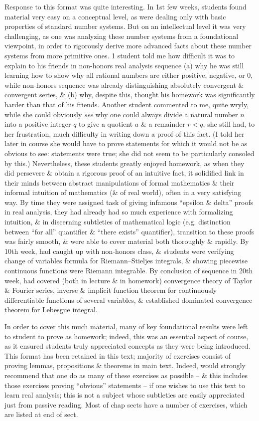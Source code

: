 \documentclass{article}
\begin{document}
\begin{itemize}
	Response to this format was quite interesting. In 1st few weeks, students found material very easy on a conceptual level, as were dealing only with basic properties of standard number systems. But on an intellectual level it was very challenging, as one was analyzing these number systems from a foundational viewpoint, in order to rigorously derive more advanced facts about these number systems from more primitive ones. 1 student told me how difficult it was to explain to his friends in non-honors real analysis sequence (a) why he was still learning how to show why all rational numbers are either positive, negative, or 0, while non-honors sequence was already distinguishing absolutely convergent \& convergent series, \& (b) why, despite this, thought his homework was significantly harder than that of his friends. Another student commented to me, quite wryly, while she could obviously {\it see} why one could always divide a natural number $n$ into a positive integer $q$ to give a quotient $a$ \& a remainder $r < q$, she still had, to her frustration, much difficulty in writing down a proof of this fact. (I told her later in course she would have to prove statements for which it would not be as obvious to see: statements were true; she did not seem to be particularly consoled by this.) Nevertheless, these students greatly enjoyed homework, as when they did persevere \& obtain a rigorous proof of an intuitive fact, it solidified link in their minds between abstract manipulations of formal mathematics \& their informal intuition of mathematics (\& of real world), often in a very satisfying way. By time they were assigned task of giving infamous ``epsilon \& delta'' proofs in real analysis, they had already had so much experience with formalizing intuition, \& in discerning subtleties of mathematical logic (e.g. distinction between ``for all'' quantifier \& ``there exists'' quantifier), transition to these proofs was fairly smooth, \& were able to cover material both thoroughly \& rapidly. By 10th week, had caught up with non-honors class, \& students were verifying change of variables formula for Riemann--Stieljes integrals, \& showing piecewise continuous functions were Riemann integrable. By conclusion of sequence in 20th week, had covered (both in lecture \& in homework) convergence theory of Taylor \& Fourier series, inverse \& implicit function theorem for continuously differentiable functions of several variables, \& established dominated convergence theorem for Lebesgue integral.
	
	In order to cover this much material, many of key foundational results were left to student to prove as homework; indeed, this was an essential aspect of course, as it ensured students truly appreciated concepts as they were being introduced. This format has been retained in this text; majority of exercises consist of proving lemmas, propositions \& theorems in main text. Indeed, would strongly recommend that one do as many of these exercises as possible -- \& this includes those exercises proving ``obvious'' statements -- if one wishes to use this text to learn real analysis; this is not a subject whose subtleties are easily appreciated just from passive reading. Most of chap sects have a number of exercises, which are listed at end of sect.
	

\end{itemize}
\end{document}
